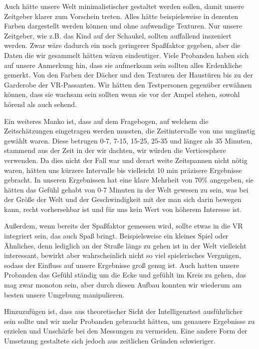 \documentclass{Bericht}
\begin{document}
Auch hätte unsere Welt minimalistischer gestaltet werden sollen, damit unsere Zeitgeber klarer zum Vorschein treten. Alles hätte beispielsweise in dezenten Farben dargestellt werden können und ohne aufwendige Texturen. Nur unsere Zeitgeber, wie z.B. das Kind auf der Schaukel, sollten auffallend inszeniert werden. Zwar wäre dadurch ein noch geringerer Spaßfaktor gegeben, aber die Daten die wir gesammelt hätten wären eindeutiger. Viele Probanden haben sich auf unsere Anmerkung hin, dass sie aufmerksam sein sollten alles Erdenkliche gemerkt. Von den Farben der Dächer und den Texturen der Haustüren bis zu der Garderobe der VR-Passanten. Wir hätten den Testpersonen gegenüber erwähnen können, dass sie wachsam sein sollten wenn sie vor der Ampel stehen, sowohl hörend als auch sehend.

Ein weiteres Manko ist, dass auf dem Fragebogen, auf welchem die Zeitschätzungen eingetragen werden mussten,  die Zeitintervalle von uns ungünstig gewählt waren. Diese betrugen 0-7, 7-15, 15-25, 25-35 und länger als 35 Minuten, stammend aus der Zeit in der wir dachten, wir würden die Verticesphere verwenden. Da dies nicht der Fall war und derart weite Zeitspannen nicht nötig waren, hätten uns kürzere Intervalle bis vielleicht 10 min präzisere Ergebnisse gebracht. In unseren Ergebnissen hat eine klare Mehrheit von 70\% angegeben, sie hätten das Gefühl gehabt von 0-7 Minuten in der Welt gewesen zu sein, was bei der Größe der Welt und der Geschwindigkeit mit der man sich darin bewegen kann, recht vorhersehbar ist und für uns kein Wert von höherem Interesse ist.

Außerdem, wenn bereits der Spaßfaktor gemessen wird, sollte etwas in die VR integriert sein, das auch Spaß bringt. Beispielsweise ein kleines Spiel oder Ähnliches, denn lediglich an der Straße längs zu gehen ist in der Welt vielleicht interessant, bewirkt aber wahrscheinlich nicht so viel spielerisches Vergnügen, sodass der Einfluss auf unsere Ergebnisse groß  genug ist. Auch hatten unsere Probanden das Gefühl ständig um die Ecke und gefühlt im Kreis zu gehen, das mag zwar monoton sein, aber durch diesen Aufbau konnten wir wiederum am besten unsere Umgebung manipulieren.

Hinzuzufügen ist, dass aus theoretischer Sicht der Intelligenztest ausführlicher sein sollte und wir mehr Probanden gebraucht hätten, um genauere Ergebnisse zu erzielen und Unschärfe bei den Messungen zu vermeiden.
Eine andere Form der Umsetzung gestaltete sich jedoch aus zeitlichen Gründen schwieriger.
\end{document}
